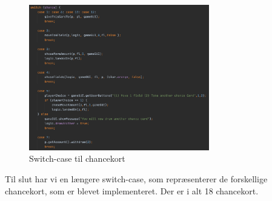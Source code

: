\begin{figure}[H]
    \centering
    \includegraphics[width=0.7\textwidth]{sources/7_implementering/ControllerChanceSwitch.png}
    \caption{Switch-case til chancekort}
    \label{fig:ControllerChanceSwitch}
\end{figure}
Til slut har vi en længere switch-case, som repræsenterer de forskellige chancekort, som er blevet implementeret. Der er i alt 18 chancekort.












